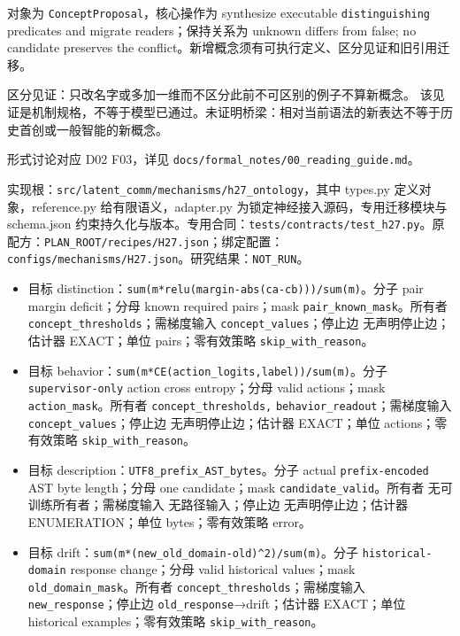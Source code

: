 \documentclass[
  10pt,
]{article}
\begin{document}
对象为 \nolinkurl{ConceptProposal}，核心操作为 synthesize executable
\nolinkurl{distinguishing} predicates and migrate readers；保持关系为
unknown differs from false; no candidate preserves the
conflict。新增概念须有可执行定义、区分见证和旧引用迁移。

区分见证：只改名字或多加一维而不区分此前不可区别的例子不算新概念。
该见证是机制规格，不等于模型已通过。未证明桥梁：相对当前语法的新表达不等于历史首创或一般智能的新概念。

形式讨论对应 D02 F03，详见
{\small\nolinkurl{docs/formal_notes/00_reading_guide.md}}。

实现根：{\small\nolinkurl{src/latent_comm/mechanisms/h27_ontology}}，其中
types.py 定义对象，reference.py 给有限语义，adapter.py
为锁定神经接入源码，专用迁移模块与 schema.json
约束持久化与版本。专用合同：{\small\nolinkurl{tests/contracts/test_h27.py}}。原配方：{\small\nolinkurl{PLAN_ROOT/recipes/H27.json}}；绑定配置：{\small\nolinkurl{configs/mechanisms/H27.json}}。研究结果：\nolinkurl{NOT_RUN}。

\begin{itemize}
\item
  目标
  distinction：{\small\nolinkurl{sum(m*relu(margin-abs(ca-cb)))/sum(m)}}。分子
  pair margin deficit；分母 known required pairs；mask
  \nolinkurl{pair_known_mask}。所有者
  \nolinkurl{concept_thresholds}；需梯度输入
  \nolinkurl{concept_values}；停止边 无声明停止边；估计器 EXACT；单位
  pairs；零有效策略 \nolinkurl{skip_with_reason}。
\item
  目标
  behavior：{\small\nolinkurl{sum(m*CE(action_logits,label))/sum(m)}}。分子
  \nolinkurl{supervisor-only} action cross entropy；分母 valid
  actions；mask \nolinkurl{action_mask}。所有者
  \nolinkurl{concept_thresholds,}
  \nolinkurl{behavior_readout}；需梯度输入
  \nolinkurl{concept_values}；停止边 无声明停止边；估计器 EXACT；单位
  actions；零有效策略 \nolinkurl{skip_with_reason}。
\item
  目标 description：{\small\nolinkurl{UTF8_prefix_AST_bytes}}。分子
  actual \nolinkurl{prefix-encoded} AST byte length；分母 one
  candidate；mask \nolinkurl{candidate_valid}。所有者
  无可训练所有者；需梯度输入 无路径输入；停止边 无声明停止边；估计器
  ENUMERATION；单位 bytes；零有效策略 error。
\item
  目标
  drift：{\small\nolinkurl{sum(m*(new_old_domain-old)^2)/sum(m)}}。分子
  \nolinkurl{historical-domain} response change；分母 valid historical
  values；mask \nolinkurl{old_domain_mask}。所有者
  \nolinkurl{concept_thresholds}；需梯度输入
  \nolinkurl{new_response}；停止边
  \nolinkurl{old_response}→drift；估计器 EXACT；单位 historical
  examples；零有效策略 \nolinkurl{skip_with_reason}。
\end{itemize}
\end{document}

